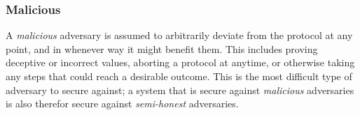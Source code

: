 \subsubsection{Malicious}

A \emph{malicious} adversary is assumed to arbitrarily deviate from the protocol at any point, and in whenever way it might benefit them\cite{goldreich1998secure}.  This includes proving deceptive or incorrect values, aborting a protocol at anytime, or otherwise taking any steps that could reach a desirable outcome.  This is the most difficult type of adversary to secure against; a system that is secure against \emph{malicious} adversaries is also therefor secure against \emph{semi-honest} adversaries.
